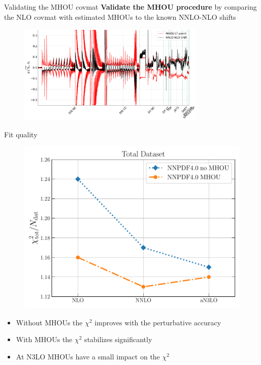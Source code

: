 \documentclass[8pt,t]{beamer}
\begin{document}
\begin{frame}{Validating the MHOU covmat}
  \textbf{Validate the MHOU procedure} by comparing the NLO covmat with estimated MHOUs to the known NNLO-NLO shifts
  \begin{figure}[!t]
    \centering
      \includegraphics[width=0.8\textwidth]{figures/shift_validation.pdf}
  \end{figure}
\end{frame}


\begin{frame}{Fit quality}
  \begin{figure}[!t]
    \includegraphics[width=.4\textwidth]{figures/chi2_n3lo_summary.pdf}
  \end{figure}
  \begin{itemize}
    \item Without MHOUs the $\chi^2$ improves with the perturbative accuracy
    \item With MHOUs the $\chi^2$ stabilizes significantly
    \item At N3LO MHOUs have a small impact on the $\chi^2$
  \end{itemize}
\end{frame}
\end{document}
